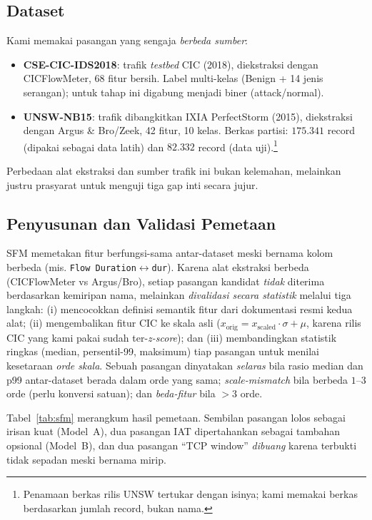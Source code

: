 \documentclass[11pt,a4paper]{article}
\begin{document}
\subsection{Dataset}
Kami memakai pasangan yang sengaja \emph{berbeda sumber}:
\begin{itemize}
  \item \textbf{CSE-CIC-IDS2018}: trafik \emph{testbed} CIC (2018), diekstraksi
  dengan CICFlowMeter, 68 fitur bersih. Label multi-kelas (Benign + 14 jenis
  serangan); untuk tahap ini digabung menjadi biner (attack/normal).
  \item \textbf{UNSW-NB15}: trafik dibangkitkan IXIA PerfectStorm (2015),
  diekstraksi dengan Argus \& Bro/Zeek, 42 fitur, 10 kelas. Berkas partisi:
  $175{.}341$ record (dipakai sebagai data latih) dan $82{.}332$ record (data
  uji).\footnote{Penamaan berkas rilis UNSW tertukar dengan isinya; kami memakai
  berkas berdasarkan jumlah record, bukan nama.}
\end{itemize}
Perbedaan alat ekstraksi dan sumber trafik ini bukan kelemahan, melainkan justru
prasyarat untuk menguji tiga gap inti secara jujur.

\subsection{Penyusunan dan Validasi Pemetaan}
\label{sec:sfmmap}
SFM memetakan fitur berfungsi-sama antar-dataset meski bernama kolom berbeda
(mis. \texttt{Flow Duration}$\leftrightarrow$\texttt{dur}). Karena alat ekstraksi
berbeda (CICFlowMeter vs Argus/Bro), setiap pasangan kandidat \emph{tidak}
diterima berdasarkan kemiripan nama, melainkan \emph{divalidasi secara statistik}
melalui tiga langkah: (i) mencocokkan definisi semantik fitur dari dokumentasi
resmi kedua alat; (ii) mengembalikan fitur CIC ke skala asli
($x_{\text{orig}} = x_{\text{scaled}}\cdot\sigma + \mu$, karena rilis CIC yang kami
pakai sudah ter-\emph{z-score}); dan (iii) membandingkan statistik ringkas
(median, persentil-99, maksimum) tiap pasangan untuk menilai kesetaraan
\emph{orde skala}. Sebuah pasangan dinyatakan \emph{selaras} bila rasio median dan
p99 antar-dataset berada dalam orde yang sama; \emph{scale-mismatch} bila berbeda
$1$--$3$ orde (perlu konversi satuan); dan \emph{beda-fitur} bila $>3$ orde.

Tabel~\ref{tab:sfm} merangkum hasil pemetaan. Sembilan pasangan lolos sebagai
irisan kuat (Model~A), dua pasangan IAT dipertahankan sebagai tambahan opsional
(Model~B), dan dua pasangan ``TCP window'' \emph{dibuang} karena terbukti tidak
sepadan meski bernama mirip.
\end{document}

